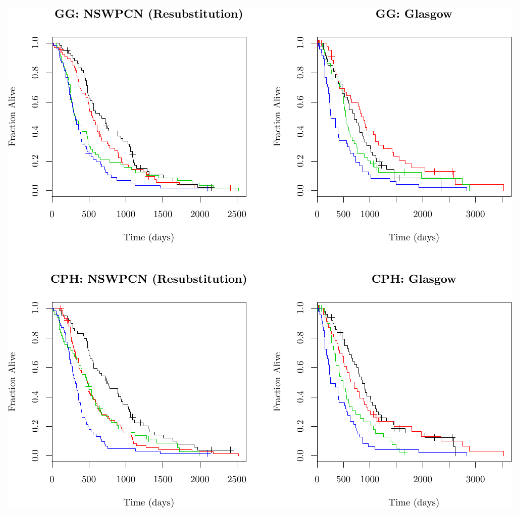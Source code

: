 \documentclass{article}\usepackage[]{graphicx}\usepackage[]{color}
\makeatletter
\def\maxwidth{ %
  \ifdim\Gin@nat@width>\linewidth
    \linewidth
  \else
    \Gin@nat@width
  \fi
}
\newenvironment{knitrout}{}{} %
\makeatother
\begin{document}
\begin{knitrout}
{\centering \includegraphics[width=\maxwidth]{figure/05-altman-4-1} 

}



\end{knitrout}
\end{document}
